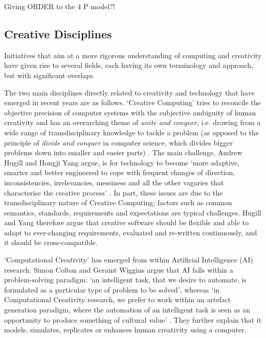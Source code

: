 \begin{draft}
  Giving ORDER to the 4 P model?!
\end{draft}



\subsection{Creative Disciplines}

\begin{draft}
  Initiatives that aim at a more rigorous understanding of computing and creativity have given rise to several fields, each having its own terminology and approach, but with significant overlaps.

  The two main disciplines directly related to creativity and technology that have emerged in recent years are as follows. `Creative Computing' tries to reconcile the objective precision of computer systems with the subjective ambiguity of human creativity \cite{Hugill2013c} and has an overarching theme of \emph{unite and conquer}, i.e. drawing from a wide range of transdisciplinary knowledge to tackle a problem (as opposed to the principle of \emph{divide and conquer} in computer science, which divides bigger problems down into smaller and easier parts) \cite{Yang2013}. The main challenge, Andrew Hugill and Hongji Yang argue, is for technology  to become `more adaptive, smarter and better engineered to cope with frequent changes of direction, inconsistencies, irrelevancies, messiness and all the other vagaries that characterise the creative process' \cite{Hugill2013c}. In part, these issues are due to the transdisciplinary nature of Creative Computing; factors such as common semantics, standards, requirements and expectations are typical challenges. Hugill and Yang therefore argue that creative software should be flexible and able to adapt to ever-changing requirements, evaluated and re-written continuously, and it should be cross-compatible.

  `Computational Creativity' has emerged from within Artificial Intelligence (AI) research. Simon Colton and Geraint Wiggins argue that AI falls within a problem-solving paradigm: `an intelligent task, that we desire to automate, is formulated as a particular type of problem to be solved', whereas `in Computational Creativity research, we prefer to work within an artefact generation paradigm, where the automation of an intelligent task is seen as an opportunity to produce something of cultural value' \cite{Colton2012}. They further explain that it models, simulates, replicates or enhances human creativity using a computer.
\end{draft}

